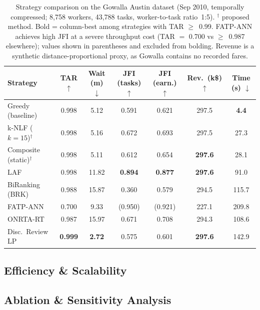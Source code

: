 \begin{table}[t]
\scriptsize
\renewcommand\arraystretch{1}
\setlength\tabcolsep{2pt}
\caption{Strategy comparison on the Gowalla Austin dataset
  (Sep 2010, temporally compressed; 8,758 workers, 43,788 tasks, worker-to-task ratio~1:5).
  $^\dagger$ proposed method. Bold = column-best among strategies with TAR $\geq$~0.99.
  FATP-ANN achieves high JFI at a severe throughput cost (TAR $=$ 0.700 vs $\geq$~0.987 elsewhere);
  values shown in parentheses and excluded from bolding.
  Revenue is a synthetic distance-proportional proxy, as Gowalla contains no recorded fares.}
\label{tab:gowalla_results}
\begin{tabular}{@{}l cccc c c@{}}
\toprule
\textbf{Strategy}
  & \textbf{TAR} $\uparrow$
  & \textbf{Wait (m)} $\downarrow$
  & \textbf{JFI (tasks)} $\uparrow$
  & \textbf{JFI (earn.)} $\uparrow$
  & \textbf{Rev.\ (k\$)} $\uparrow$
  & \textbf{Time (s)} $\downarrow$ \\
\midrule
Greedy (baseline)
  & 0.998 & 5.12 & 0.591 & 0.621 & 297.5 & \textbf{4.4} \\
k-NLF ($k{=}15$)$^\dagger$
  & 0.998 & 5.16 & 0.672 & 0.693 & 297.5 & 27.3 \\
Composite (static)$^\dagger$
  & 0.998 & 5.11 & 0.612 & 0.654 & \textbf{297.6} & 28.1 \\
\midrule
LAF
  & 0.998 & 11.82 & \textbf{0.894} & \textbf{0.877} & \textbf{297.6} & 91.0 \\
BiRanking (BRK)
  & 0.988 & 15.87 & 0.360 & 0.579 & 294.5 & 115.7 \\
FATP-ANN
  & 0.700 & 9.33 & (0.950) & (0.921) & 227.1 & 209.8 \\
ONRTA-RT
  & 0.987 & 15.97 & 0.671 & 0.708 & 294.3 & 108.6 \\
Disc.\ Review LP
  & \textbf{0.999} & \textbf{2.72} & 0.575 & 0.601 & \textbf{297.6} & 142.9 \\
\bottomrule
\end{tabular}
\end{table}



\subsection{Efficiency \& Scalability}
\label{sec:scalability}


\subsection{Ablation \& Sensitivity Analysis}
\label{sec:ablation}

